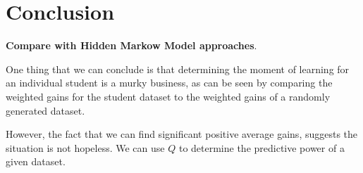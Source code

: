 \documentclass{acmlarge-edm}
\begin{document}
\section{Conclusion}

{\bf Compare with Hidden Markow Model approaches}.

One thing that we can conclude is that determining the
moment of learning for an individual student is a murky
business, as can be seen by comparing the weighted gains for
the student dataset to the weighted gains of a 
randomly generated dataset.

However, the fact that we can find significant positive average gains,
suggests the situation is not hopeless.  We can use $Q$ to determine
the predictive power of a given dataset. 




\end{document}
